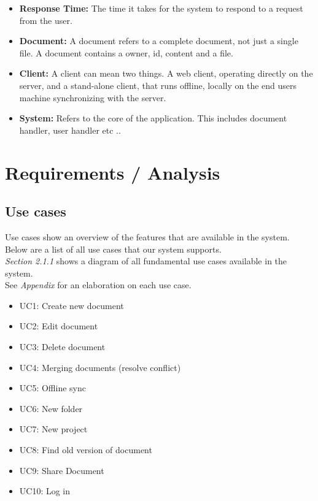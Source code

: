 \documentclass[11pt]{article}
\begin{document}
\begin{itemize}
\item \textbf{Response Time:} The time it takes for the system to respond to a request from the user.
\item \textbf{Document:} A document refers to a complete document, not just a single file. A document contains a owner, id, content and a file.
\item \textbf{Client:} A client can mean two things. A web client, operating directly on the server, and a stand-alone client, that runs offline, 
     locally on the end users machine synchronizing with the server.
\item \textbf{System:} Refers to the core of the application. This includes document handler, user handler etc ..
\end{itemize}
\section{Requirements / Analysis}
\label{sec-2}
\subsection{Use cases}
\label{sec-2-1}
Use cases show an overview of the features that are available in the system. Below are a list of all use cases that our system supports. \\
\emph{Section 2.1.1} shows a diagram of all fundamental use cases available in the system. \\
See \emph{Appendix} for an elaboration on each use case. \\

\begin{itemize}
\item UC1: Create new document
\item UC2: Edit document
\item UC3: Delete document
\item UC4: Merging documents (resolve conflict)
\item UC5: Offline sync
\item UC6: New folder
\item UC7: New project
\item UC8: Find old version of document
\item UC9: Share Document
\item UC10: Log in
\end{itemize}
\end{document}
